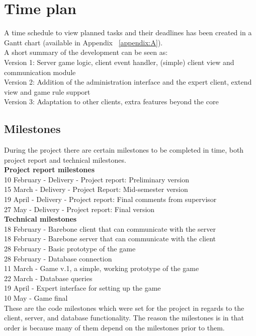 \section{Time plan}
A time schedule to view planned tasks and their deadlines has been created in a 
Gantt chart (available in Appendix ~\ref{appendix:A}). 
\\\newline
A short summary of the development can be seen as:\\
Version 1: Server game logic, client event handler, (simple) client view and 
communication module \\
Version 2: Addition of the administration interface and the expert client, 
extend view and game rule support\\
Version 3: Adaptation to other clients, extra features beyond the core \\

\subsection{Milestones} 
During the project there are certain milestones to be completed in time, both project report and technical milestones. \\
\newline
\textbf{Project report milestones}\\
10 February - Delivery - Project report: Preliminary version\\
15 March - Delivery - Project Report: Mid-semester version\\
19 April - Delivery - Project report: Final comments from supervisor\\
27 May - Delivery - Project report: Final version\\
\newline
\textbf{Technical milestones} \\
18 February - Barebone client that can communicate with the server \\
18 February - Barebone server that can communicate with the client\\
28 February - Basic prototype of the game\\
28 February - Database connection\\
11 March - Game v.1, a simple, working prototype of the game\\
22 March - Database queries\\
19 April - Expert interface for setting up the game\\
10 May - Game final\\
\newline
These are the code milestones which were set for the project in regards to the 
client, server, and database functionality. The reason the milestones is in that 
order is because many of them depend on the milestones prior to them. \\



